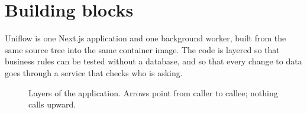 \chapter{Building blocks}\label{ch:blocks}

Uniflow is one Next.js application and one background worker, built from the same source tree
into the same container image. The code is layered so that business rules can be tested without a
database, and so that every change to data goes through a service that checks who is asking.

\begin{figure}[htbp]
  \centering
  
  \caption{Layers of the application. Arrows point from caller to callee; nothing calls upward.}
  \label{fig:layers}
\end{figure}

